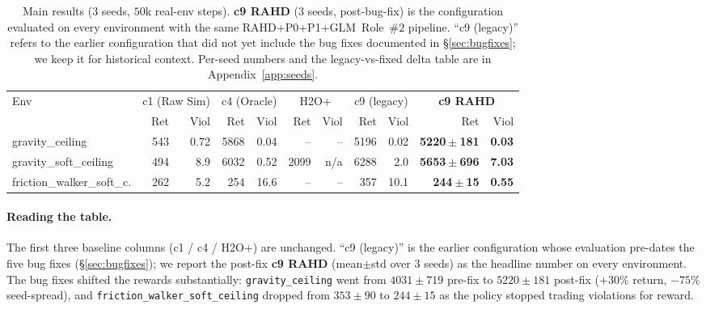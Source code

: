 \documentclass{article}
\theoremstyle{definition}
\begin{document}
\begin{table}[h]
\caption{Main results (3 seeds, $50$k real-env steps).
\textbf{c9 RAHD} (3 seeds, post-bug-fix) is the configuration evaluated
on every environment with the same RAHD+P0+P1+GLM~Role~\#$2$ pipeline.
``c9 (legacy)'' refers to the earlier configuration that did not yet
include the bug fixes documented in §\ref{sec:bugfixes}; we keep it for
historical context.  Per-seed numbers and the legacy-vs-fixed delta
table are in Appendix~\ref{app:seeds}.}
\label{tab:main}
\centering
\small
\begin{tabular}{l|rr|rr|rr|rr|rr}
\toprule
Env & \multicolumn{2}{c|}{c1 (Raw Sim)} & \multicolumn{2}{c|}{c4 (Oracle)} & \multicolumn{2}{c|}{H2O+} & \multicolumn{2}{c|}{c9 (legacy)} & \multicolumn{2}{c}{\textbf{c9 RAHD}} \\
 & Ret & Viol & Ret & Viol & Ret & Viol & Ret & Viol & Ret & Viol \\
\midrule
gravity\_ceiling           & 543    & 0.72  & 5868 & 0.04  & --    & --   & 5196 & 0.02 & \textbf{5220$\!\pm\!$181} & \textbf{0.03}  \\
gravity\_soft\_ceiling     & 494    & 8.9   & 6032 & 0.52  & 2099  & n/a  & 6288 & 2.0  & \textbf{5653$\!\pm\!$696} & \textbf{7.03}  \\
friction\_walker\_soft\_c. & 262    & 5.2   & 254  & 16.6  & --    & --   & 357  & 10.1 & \textbf{244$\!\pm\!$15}   & \textbf{0.55}  \\
\bottomrule
\end{tabular}
\end{table}

\paragraph{Reading the table.}  The first three baseline columns
(c1 / c4 / H2O+) are unchanged.  ``c9 (legacy)'' is the earlier
configuration whose evaluation pre-dates the five bug fixes
(\S\ref{sec:bugfixes}); we report the post-fix
\textbf{c9 RAHD} (mean$\pm$std over $3$ seeds) as the headline number
on every environment.  The bug fixes shifted the rewards substantially:
\texttt{gravity\_ceiling} went from $4031\pm 719$ pre-fix to $5220\pm
181$ post-fix ($+30\%$ return, $-75\%$ seed-spread), and
\texttt{friction\_walker\_soft\_ceiling} dropped from $353\pm 90$ to
$244\pm 15$ as the policy stopped trading violations for reward.
\end{document}
